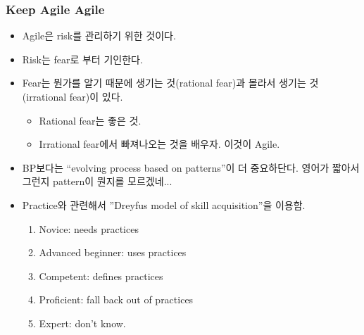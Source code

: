 \begin{frame}
\frametitle{Keep Agile Agile}

\begin{itemize}
\item Agile은 risk를 관리하기 위한 것이다.
\item Risk는 fear로 부터 기인한다.
\item Fear는 뭔가를 알기 때문에 생기는 것(rational fear)과 몰라서 생기는 것(irrational fear)이 있다.
    \begin{itemize}
    \item Rational fear는 좋은 것.
    \item Irrational fear에서 빠져나오는 것을 배우자. 이것이 Agile.
    \end{itemize}
\item BP보다는 ``evolving process based on patterns''이 더 중요하단다.
  영어가 짧아서 그런지 pattern이 뭔지를 모르겠네...
\item Practice와 관련해서 ”Dreyfus model of skill acquisition”을 이용함.
    \begin{enumerate}
    \item Novice: needs practices
    \item Advanced beginner: uses practices
    \item Competent: defines practices
    \item Proficient: fall back out of practices
    \item Expert: don't know.
    \end{enumerate}
\end{itemize}
\end{frame}
